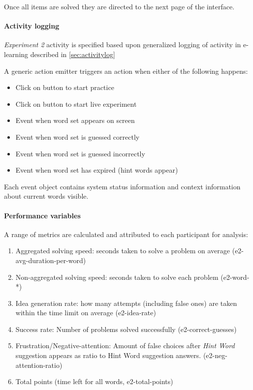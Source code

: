 		Once all items are solved they are directed to the next page of the interface.
				
		\paragraph{Activity logging} \textit{Experiment 2} activity is specified based upon generalized logging of activity in e-learning described in \ref{sec:activitylog}
		
		A generic action emitter triggers an action when either of the following happens:
		
		\begin{itemize}
			\item Click on button to start practice
			\item Click on button to start live experiment
			\item Event when word set appears on screen
			\item Event when word set is guessed correctly
			\item Event when word set is guessed incorrectly
			\item Event when word set has expired (hint words appear)
		\end{itemize}
	
		Each event object contains system status information and context information about current words visible.

		\paragraph{Performance variables} \label{sec:creativity-parameters}
		
		A range of metrics are calculated and attributed to each participant for analysis:
		
		\begin{enumerate}
			\item Aggregated solving speed: seconds taken to solve a problem on average (e2-avg-duration-per-word)
			\item Non-aggregated solving speed: seconds taken to solve each problem (e2-word-*)
			\item Idea generation rate: how many attempts (including false ones) are taken within the time limit on average (e2-idea-rate)
			\item Success rate: Number of problems solved successfully (e2-correct-guesses)
			\item Frustration/Negative-attention: Amount of false choices after \textit{Hint Word} suggestion appears as ratio to Hint Word suggestion answers. (e2-neg-attention-ratio)
			\item Total points (time left for all words, e2-total-points)
		\end{enumerate}
	
